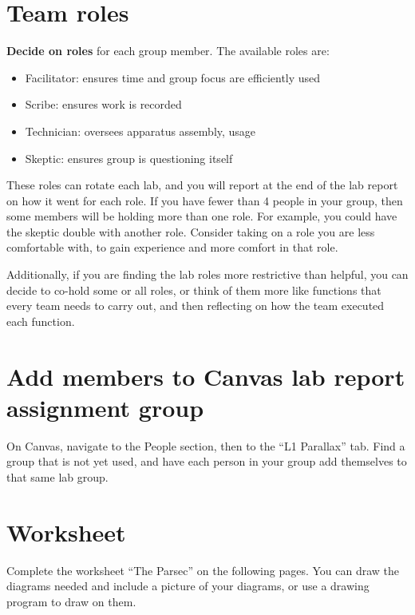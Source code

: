 \section{Team roles}

\textbf{Decide on roles} for each group member. The available roles are:

\begin{itemize}
	\item Facilitator: ensures time and group focus are efficiently used
	\item Scribe: ensures work is recorded
	\item Technician: oversees apparatus assembly, usage
	\item Skeptic: ensures group is questioning itself
\end{itemize}

These roles can rotate each lab, and you will report at the end of the lab report on how it went for each role. If you have fewer than 4 people in your group, then some members will be holding more than one role. For example, you could have the skeptic double with another role. Consider taking on a role you are less comfortable with, to gain experience and more comfort in that role.

Additionally, if you are finding the lab roles more restrictive than helpful, you can decide to co-hold some or all roles, or think of them more like functions that every team needs to carry out, and then reflecting on how the team executed each function.

\section{Add members to Canvas lab report assignment group}

\begin{steps}
	\item On Canvas, navigate to the People section, then to the ``L1 Parallax'' tab. Find a group that is not yet used, and have each person in your group add themselves to that same lab group.
\end{steps}

\section{Worksheet}

Complete the worksheet ``The Parsec'' on the following pages. You can draw the diagrams needed and include a picture of your diagrams, or use a drawing program to draw on them.

